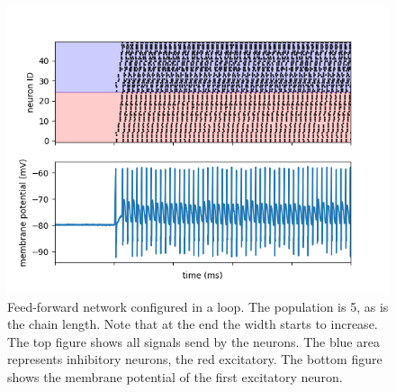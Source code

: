 \documentclass[a4paper,twocolumn]{article}
\begin{document}
\begin{figure}
    \centering
    \includegraphics[width=.5\textwidth]{figures/feedforward signals loop.png}
    \caption{Feed-forward network configured in a loop. The population is 5, as
        is the chain length. Note that at the end the width starts to increase.
        The top figure shows all signals send by the neurons. The blue area
        represents inhibitory neurons, the red excitatory. The bottom figure
        shows the membrane potential of the first excitatory neuron.}
    \label{fig:feed-forward-loop}
\end{figure}
\end{document}

